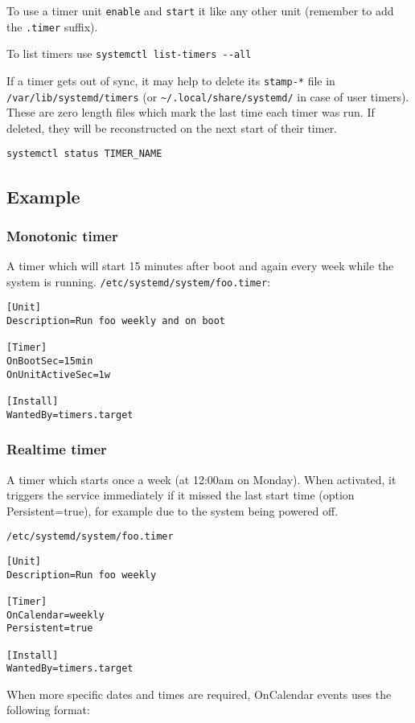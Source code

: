 To use a timer unit \verb+enable+ and \verb+start+ it like any other unit
(remember to add the \verb+.timer+ suffix). 

To list timers use \verb+systemctl list-timers --all+

If a timer gets out of sync, it may help to delete its \verb+stamp-*+ file in
\verb+/var/lib/systemd/timers+ (or \verb+~/.local/share/systemd/+ in case of
user timers). These are zero length files which mark the last time each timer
was run. If deleted, they will be reconstructed on the next start of their
timer.

\verb+systemctl status TIMER_NAME+


\subsection{Example}

\subsubsection{Monotonic timer}

A timer which will start 15 minutes after boot and again every week while the
system is running.
\verb+/etc/systemd/system/foo.timer+:
\begin{verbatim}
[Unit]
Description=Run foo weekly and on boot

[Timer]
OnBootSec=15min
OnUnitActiveSec=1w

[Install]
WantedBy=timers.target
\end{verbatim}

\subsubsection{Realtime timer}

A timer which starts once a week (at 12:00am on Monday). When activated, it
triggers the service immediately if it missed the last start time (option
Persistent=true), for example due to the system being powered off.

\verb+/etc/systemd/system/foo.timer+

\begin{verbatim}
[Unit]
Description=Run foo weekly

[Timer]
OnCalendar=weekly
Persistent=true

[Install]
WantedBy=timers.target
\end{verbatim}


When more specific dates and times are required, OnCalendar events uses the
following format:

